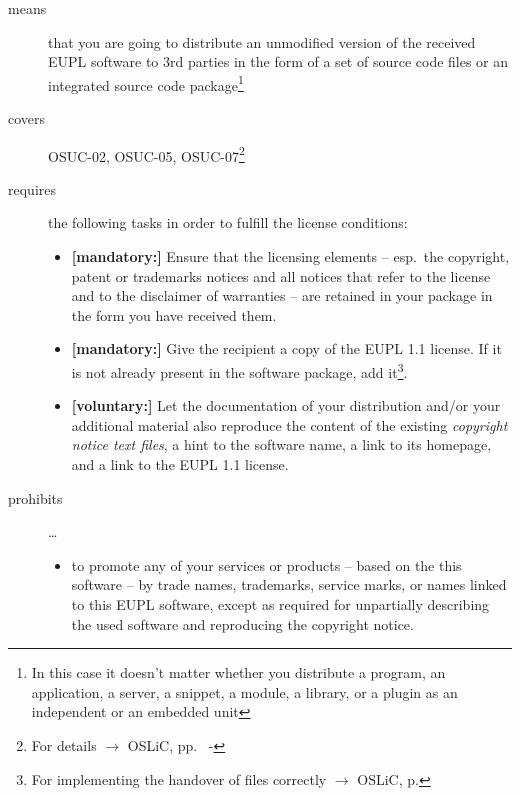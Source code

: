 \begin{description}

\item[means] that you are going to distribute an unmodified version of the
received EUPL software to 3rd parties in the form of a set of source code files or
an integrated source code package\footnote{In this case it doesn't matter
whether you  distribute a program, an application, a server, a snippet, a
module, a library, or a plugin as an independent or an embedded unit}

\item[covers] OSUC-02, OSUC-05, OSUC-07\footnote{For details $\rightarrow$ OSLiC, pp.\ 
\pageref{OSUC-02-DEF} - \pageref{OSUC-07-DEF}}

\item[requires] the following tasks in order to fulfill the license conditions:
\begin{itemize}
  
  \item \textbf{[mandatory:]} Ensure that the licensing elements -- esp.\ the
  copyright, patent or trademarks notices and all notices that refer to the
  license and to the disclaimer of warranties -- are retained in your package in
  the form you have received them.
  
  \item \textbf{[mandatory:]} Give the recipient a copy of the EUPL 1.1
  license. If it is not already present in the software package, add
  it\footnote{For implementing the handover of files correctly $\rightarrow$
  OSLiC, p. \pageref{DistributingFilesHint}}.
  
  \item \textbf{[voluntary:]} Let the documentation of your distribution and/or
  your additional material also reproduce the content of the existing
  \emph{copyright notice text files}, a hint to the software name, a link to its
  homepage, and a link to the EUPL 1.1 license.
\end{itemize}

\item[prohibits] \ldots
\begin{itemize}
  \item to promote any of your services or products -- based on the this software
  -- by trade names, trademarks, service marks, or names linked to this EUPL
  software, except as required for unpartially describing the used software and
  reproducing the copyright notice.
\end{itemize}

\end{description}


